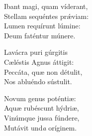 Ibant magi, quam víderant,\\
Stellam sequéntes prǽviam:\\
Lumen requírunt lúmine:\\
Deum faténtur múnere.

Lavácra puri gúrgitis\\
Cæléstis Agnus áttigit:\\
Peccáta, quæ non détulit,\\
Nos abluéndo sústulit.

Novum genus poténtiæ:\\
Aquæ rubéscunt hýdriæ,\\
Vinúmque jussa fúndere,\\
Mutávit und\textit{a} oríginem.

